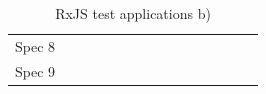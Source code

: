 \begin{table}[]
{\begin{tabular}{lllllllllllllll}
		Spec 8            & \myes            & \myes             & \mno           & \myes              & \myes                 & \myes            & \myes                & \myes             & \mno               & \myes                  & \myes             & \myes             & \myes                & \mno   \\
		Spec 9            & \myes            & \myes             & \mno\footnote[3],\myes         & \mno\footnote[3],\myes            & \mno\footnote[3],\myes               & \mno\footnote[3],\myes          & \myes                & \myes             & \myes               & \mno\footnote[3],\myes                & \myes             & \mno\footnote[3],\myes           & \mno\footnote[3],\myes              & \mno\footnote[3],\myes
	\end{tabular}%
}
\caption{RxJS test applications b)}
\label{tab:RxJSb}
\end{table}

